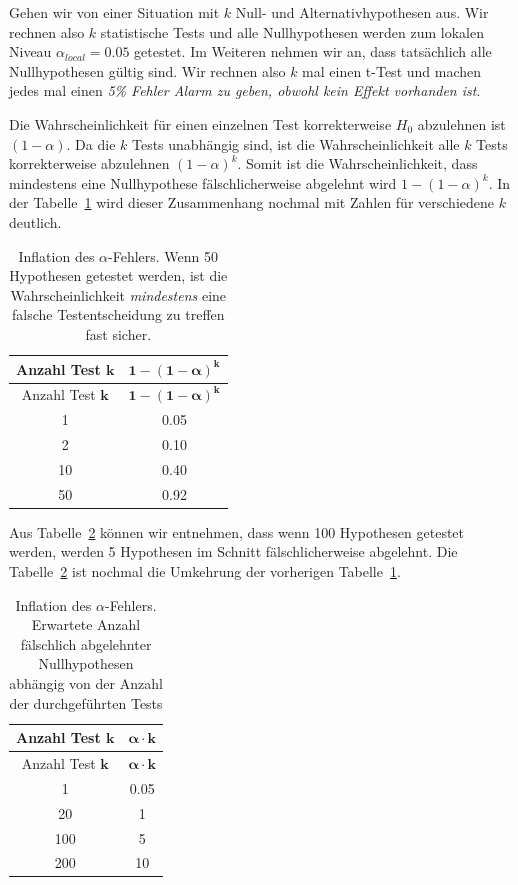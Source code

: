 \documentclass[
  letterpaper,
  DIV=11,
  oneside]{scrreport}
\begin{document}
Gehen wir von einer Situation mit \(k\) Null- und Alternativhypothesen
aus. Wir rechnen also \(k\) statistische Tests und alle Nullhypothesen
werden zum lokalen Niveau \(\alpha_{local} = 0.05\) getestet. Im
Weiteren nehmen wir an, dass tatsächlich alle Nullhypothesen gültig
sind. Wir rechnen also \(k\) mal einen t-Test und machen jedes mal einen
\emph{5\% Fehler Alarm zu geben, obwohl kein Effekt vorhanden ist}.

Die Wahrscheinlichkeit für einen einzelnen Test korrekterweise \(H_0\)
abzulehnen ist \((1 − \alpha)\). Da die \(k\) Tests unabhängig sind, ist
die Wahrscheinlichkeit alle \(k\) Tests korrekterweise abzulehnen
\((1 − \alpha)^k\). Somit ist die Wahrscheinlichkeit, dass mindestens
eine Nullhypothese fälschlicherweise abgelehnt wird \(1-(1-\alpha)^k\).
In der Tabelle~\ref{tbl-mult-alpha} wird dieser Zusammenhang nochmal mit
Zahlen für verschiedene \(k\) deutlich.

\hypertarget{tbl-mult-alpha}{}
\begin{longtable}[]{@{}cc@{}}
\caption{\label{tbl-mult-alpha}Inflation des \(\alpha\)-Fehlers. Wenn 50
Hypothesen getestet werden, ist die Wahrscheinlichkeit \emph{mindestens}
eine falsche Testentscheidung zu treffen fast sicher.}\tabularnewline
\toprule()
Anzahl Test \(\boldsymbol{k}\) & \(\boldsymbol{1-(1-\alpha)^k}\) \\
\midrule()
\endfirsthead
\toprule()
Anzahl Test \(\boldsymbol{k}\) & \(\boldsymbol{1-(1-\alpha)^k}\) \\
\midrule()
\endhead
1 & 0.05 \\
2 & 0.10 \\
10 & 0.40 \\
50 & 0.92 \\
\bottomrule()
\end{longtable}

Aus Tabelle~\ref{tbl-mult-null} können wir entnehmen, dass wenn 100
Hypothesen getestet werden, werden 5 Hypothesen im Schnitt
fälschlicherweise abgelehnt. Die Tabelle~\ref{tbl-mult-null} ist nochmal
die Umkehrung der vorherigen Tabelle~\ref{tbl-mult-alpha}.

\hypertarget{tbl-mult-null}{}
\begin{longtable}[]{@{}cc@{}}
\caption{\label{tbl-mult-null}Inflation des \(\alpha\)-Fehlers.
Erwartete Anzahl fälschlich abgelehnter Nullhypothesen abhängig von der
Anzahl der durchgeführten Tests}\tabularnewline
\toprule()
Anzahl Test \(\boldsymbol{k}\) & \(\boldsymbol{\alpha \cdot k}\) \\
\midrule()
\endfirsthead
\toprule()
Anzahl Test \(\boldsymbol{k}\) & \(\boldsymbol{\alpha \cdot k}\) \\
\midrule()
\endhead
1 & 0.05 \\
20 & 1 \\
100 & 5 \\
200 & 10 \\
\bottomrule()
\end{longtable}
\end{document}
